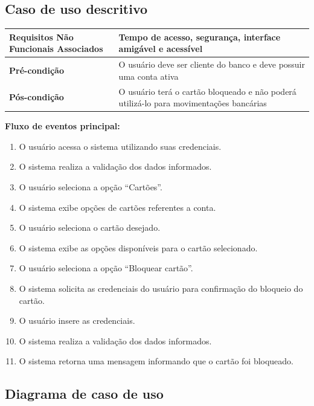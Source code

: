 \subsection{Caso de uso descritivo}

\begin{table}[h]
  \centering
  \begin{tabular}{|p{4cm} | p{10cm} |}
      \hline
      \small{\textbf{Requisitos Não Funcionais Associados}}	&	Tempo de acesso, segurança, interface amigável e acessível	\\ \hline
      \small{\textbf{Pré-condição}}	&	O usuário deve ser cliente do banco e deve possuir uma conta ativa	\\ \hline
      \small{\textbf{Pós-condição}}	&	O usuário terá o cartão bloqueado e não poderá utilizá-lo para movimentações bancárias	\\ \hline
    \end{tabular}
\end{table}

\textbf{Fluxo de eventos principal:}

\begin{enumerate}
  \item O usuário acessa o sistema utilizando suas credenciais.
  \item O sistema realiza a validação dos dados informados.
  \item O usuário seleciona a opção ``Cartões''.
  \item O sistema exibe opções de cartões referentes a conta.
  \item O usuário seleciona o cartão desejado.
  \item O sistema exibe as opções disponíveis para o cartão selecionado.
  \item O usuário seleciona a opção ``Bloquear cartão''.
  \item O sistema solicita as credenciais do usuário para confirmação do bloqueio do cartão.
  \item O usuário insere as credenciais.
  \item O sistema realiza a validação dos dados informados.
  \item O sistema retorna uma mensagem informando que o cartão foi bloqueado.
\end{enumerate}

\subsection{Diagrama de caso de uso}

